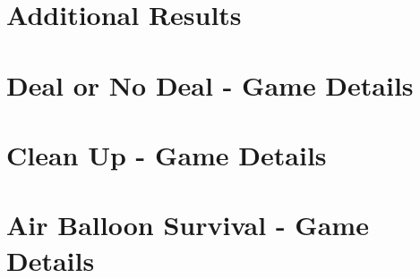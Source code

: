 \documentclass[11pt]{article}
\begin{document}
\appendix

\section{Additional Results}\label{sec:appendix_reamining_details}


\section{Deal or No Deal - Game Details}\label{sec:appendix_dond}



\section{Clean Up - Game Details}\label{sec:appendix_clean_up}


\section{Air Balloon Survival - Game Details}\label{sec:appendix_airballoon}

\end{document}
